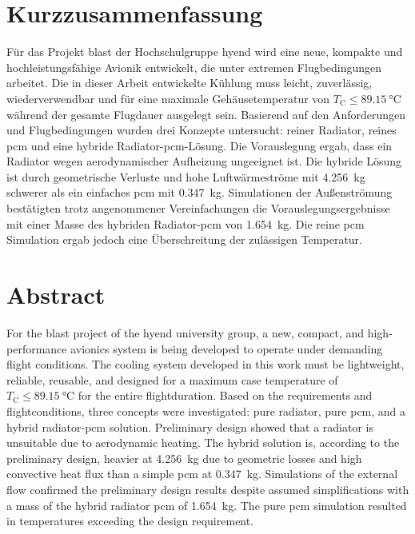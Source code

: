 \chapter*{Kurzzusammenfassung} %
\label{chap:Kurzzusammenfassung}


Für das Projekt \ac{blast} der Hochschulgruppe \ac{hyend} wird eine neue, kompakte und hochleistungsfähige Avionik entwickelt,
die unter extremen Flugbedingungen arbeitet. Die in dieser Arbeit entwickelte Kühlung muss leicht, zuverlässig, wiederverwendbar und für eine
maximale Gehäusetemperatur von $T_\mathrm{C} \leq \SI{89.15}{\celsius}$ während der gesamte Flugdauer ausgelegt sein.
Basierend auf den Anforderungen und Flugbedingungen
wurden drei Konzepte untersucht: reiner Radiator, reines \ac{pcm} und eine hybride Radiator-\ac{pcm}-Lösung. Die Vorauslegung
ergab, dass ein Radiator wegen aerodynamischer Aufheizung ungeeignet ist. Die hybride Lösung ist durch geometrische
Verluste und hohe Luftwärmeströme mit \SI{4,256}{\kilogram} schwerer als ein einfaches \ac{pcm}
mit \SI{0,347}{\kilogram}. Simulationen der Außenströmung
bestätigten trotz angenommener Vereinfachungen die Vorauslegungsergebnisse mit einer Masse des hybriden Radiator-\ac{pcm} von \SI{1,654}{\kilogram}.
Die reine \ac{pcm} Simulation ergab jedoch eine Überschreitung der zulässigen Temperatur.

\chapter*{Abstract} %
\label{chap:Abstract}
For the \ac{blast} project of the \ac{hyend} university group, a new, compact, and high-performance avionics system is being developed to
operate under demanding flight conditions. The cooling system developed in this work must be lightweight, reliable, reusable, and designed for a maximum
case temperature of $T_\mathrm{C} \leq \SI{89.15}{\celsius}$ for the entire flightduration.
Based on the requirements and flightconditions, three concepts were investigated: pure radiator, pure \ac{pcm}, and a hybrid radiator-\ac{pcm}
solution. Preliminary design showed that a radiator is unsuitable due to aerodynamic heating. The hybrid solution is, according to
the preliminary design, heavier at \SI{4,256}{\kilogram} due to geometric losses and high convective heat flux than a simple \ac{pcm} at
\SI{0,347}{\kilogram}. Simulations of the external flow confirmed the preliminary design results despite assumed
simplifications with a mass of the hybrid radiator \ac{pcm} of \SI{1,654}{\kilogram}. The pure \ac{pcm} simulation resulted in temperatures
exceeding the design requirement.